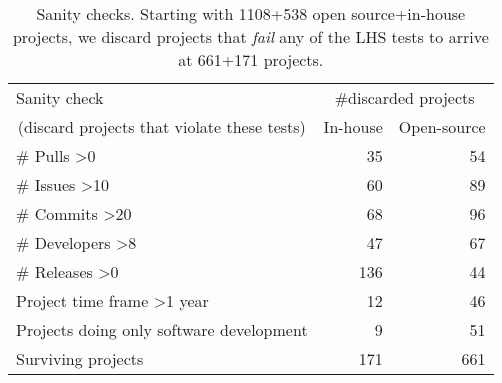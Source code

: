 \begin{wraptable}[13]{r!}{0.6\textwidth}
\footnotesize
\centering
\caption{Sanity checks. Starting with 1108+538  open source+in-house projects, we discard  projects that {\em fail}
any of the LHS tests to arrive at 661+171 projects.}\label{tab:sanity}
\begin{tabular}{|l|r|r|}
\hline
Sanity check & \multicolumn{2}{c|}{\#discarded projects}                     \\ \cline{2-3} 
\multicolumn{1}{|c|}{(discard projects that violate these tests) }                              & \multicolumn{1}{l|}{In-house} & \multicolumn{1}{l|}{Open-source} \\ \hline
\# Pulls \textgreater 0                             & 35                            & 54                              \\
\# Issues \textgreater 10                            & 60                            & 89                              \\
\# Commits \textgreater 20                          & 68                            & 96                              \\
\# Developers \textgreater 8                        & 47                            & 67                              \\
\# Releases \textgreater 0                          & 136                           & 44                              \\
Project time frame \textgreater 1 year              & 12                            & 46                              \\
Projects doing only software development            & 9                             & 51                              \\ \hline
Surviving projects                                  & 171                           & 661                             \\ \hline
\end{tabular}
\end{wraptable}